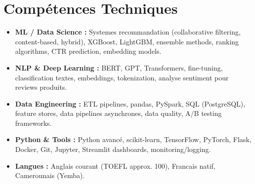 \documentclass[a4paper,11pt]{article}
\begin{document}
\section{Comp\'etences Techniques}
\begin{itemize}[leftmargin=*, nosep]
    \item \small{\textbf{ML / Data Science :} Systemes recommandation (collaborative filtering, content-based, hybrid), XGBoost, LightGBM, ensemble methods, ranking algorithms, CTR prediction, embedding models.}
    \item \small{\textbf{NLP \& Deep Learning :} BERT, GPT, Transformers, fine-tuning, classification textes, embeddings, tokenization, analyse sentiment pour reviews produits.}
    \item \small{\textbf{Data Engineering :} ETL pipelines, pandas, PySpark, SQL (PostgreSQL), feature stores, data pipelines asynchrones, data quality, A/B testing frameworks.}
    \item \small{\textbf{Python \& Tools :} Python avancé, scikit-learn, TensorFlow, PyTorch, Flask, Docker, Git, Jupyter, Streamlit dashboards, monitoring/logging.}
    \item \small{\textbf{Langues :} Anglais courant (TOEFL approx. 100), Francais natif, Camerounais (Yemba).}
\end{itemize}
\end{document}
